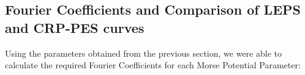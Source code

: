 \documentclass[12pt]{article}
\begin{document}
\subsection{Fourier Coefficients and Comparison of LEPS and CRP-PES curves}
\vspace{5mm}
Using the parameters obtained from the previous section, we were able to calculate the required Fourier Coefficients for each Morse Potential Parameter:

\begin{table}[h!]\centering
{}
\caption{Fourier Coefficients for the Morse Potential Parameters}
\label{t3}
\end{table} 
\end{document}
